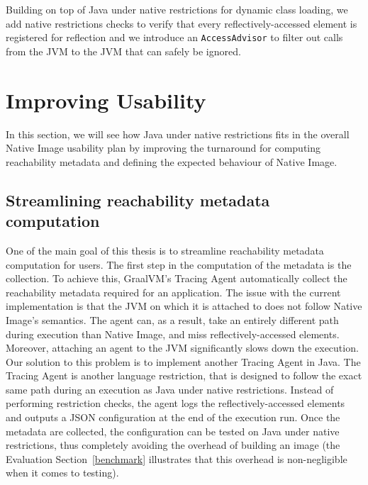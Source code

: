 Building on top of Java under native restrictions for dynamic class loading, we add native restrictions checks to verify that every reflectively-accessed element is registered for reflection and we introduce an \verb|AccessAdvisor| to filter out calls from the JVM to the JVM that can safely be ignored.

\section{Improving Usability}
In this section, we will see how Java under native restrictions fits in the overall Native Image usability plan by improving the turnaround for computing reachability metadata and defining the expected behaviour of Native Image. 

\subsection{Streamlining reachability metadata computation}
One of the main goal of this thesis is to streamline reachability metadata computation for users.
The first step in the computation of the metadata is the collection. To achieve this, GraalVM's Tracing Agent automatically collect the reachability metadata required for an application. The issue with the current implementation is that the JVM on which it is attached to does not follow Native Image's semantics. The agent can, as a result, take an entirely different path during execution than Native Image, and miss reflectively-accessed elements. Moreover, attaching an agent to the JVM significantly slows down the execution.
Our solution to this problem is to implement another Tracing Agent in Java. The Tracing Agent is another language restriction, that is designed to follow the exact same path during an execution as Java under native restrictions. Instead of performing restriction checks, the agent logs the reflectively-accessed elements and outputs a JSON configuration at the end of the execution run. 
Once the metadata are collected, the configuration can be tested on Java under native restrictions, thus completely avoiding the overhead of building an image (the Evaluation Section~\ref{benchmark} illustrates that this overhead is non-negligible when it comes to testing).  


